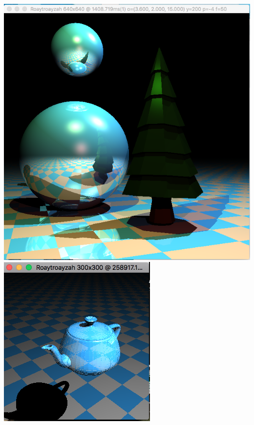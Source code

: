 \includegraphics[width=\textwidth]{img/treeSpheres}
\includegraphics[width=\textwidth]{img/wierdTeapot}
